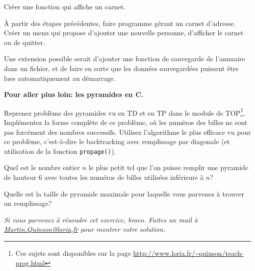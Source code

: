 \documentclass[10pt]{article}\usepackage[correction]{esial}
\begin{document}
\Question Créer une fonction qui affiche un carnet.

\Question À partir des étapes précédentes, faire programme gérant un carnet
d'adresse. Créer un menu qui propose d'ajouter une nouvelle personne,
d'afficher le carnet ou de quitter.

\medskip
Une extension possible serait d'ajouter une fonction de sauvegarde de
l'annuaire dans un fichier, et de faire en sorte que les données sauvegardées
puissent être lues automatiquement au démarrage. 

\Exercice \textbf{Pour aller plus loin: les pyramides en C.}

Reprenez problème des pyramides vu en TD et en TP dans le module de
TOP\footnote{Ces sujets sont disponibles sur la page
  \url{http://www.loria.fr/~quinson/teach-prog.html}}. Implémentez la forme
complète de ce problème, où les numéros des billes ne sont pas forcément des
nombres successifs. Utilisez l'algorithme le plus efficace vu pour ce problème,
c'est-à-dire le backtracking avec remplissage par diagonale (et utilisation de
la fonction \texttt{propage()}).

\Question Quel est le nombre entier $n$ le plus petit tel que l'on puisse
remplir une pyramide de hauteur 6 avec toutes les numéros de billes utilisées
inférieurs à $n$?

\Question Quelle est la taille de pyramide maximale pour laquelle vous parvenez
à trouver un remplissage? 

\medskip\noindent\textit{Si vous parvenez à résoudre cet exercice,
  bravo. Faites un mail à \url{Martin.Quinson@loria,fr} pour montrer votre
  solution.}
\end{document}
